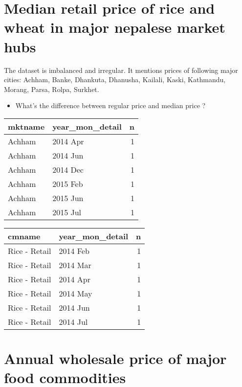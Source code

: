 \documentclass[12pt,]{article}
\providecommand{\tightlist}{%
  \setlength{\itemsep}{0pt}\setlength{\parskip}{0pt}}
\begin{document}
\hypertarget{median-retail-price-of-rice-and-wheat-in-major-nepalese-market-hubs}{%
\section{Median retail price of rice and wheat in major nepalese market hubs}\label{median-retail-price-of-rice-and-wheat-in-major-nepalese-market-hubs}}

The dataset is imbalanced and irregular. It mentions prices of following major cities: Achham, Banke, Dhankuta, Dhanusha, Kailali, Kaski, Kathmandu, Morang, Parsa, Rolpa, Surkhet.

\begin{itemize}
\tightlist
\item
  What's the difference between regular price and median price ?
\end{itemize}

\begin{tabular}{llr}
\toprule
mktname & year\_mon\_detail & n\\
\midrule
Achham & 2014 Apr & 1\\
Achham & 2014 Jun & 1\\
Achham & 2014 Dec & 1\\
Achham & 2015 Feb & 1\\
Achham & 2015 Jun & 1\\
\addlinespace
Achham & 2015 Jul & 1\\
\bottomrule
\end{tabular}

\begin{tabular}{llr}
\toprule
cmname & year\_mon\_detail & n\\
\midrule
Rice - Retail & 2014 Feb & 1\\
Rice - Retail & 2014 Mar & 1\\
Rice - Retail & 2014 Apr & 1\\
Rice - Retail & 2014 May & 1\\
Rice - Retail & 2014 Jun & 1\\
\addlinespace
Rice - Retail & 2014 Jul & 1\\
\bottomrule
\end{tabular}

\hypertarget{annual-wholesale-price-of-major-food-commodities}{%
\section{Annual wholesale price of major food commodities}\label{annual-wholesale-price-of-major-food-commodities}}
\end{document}
